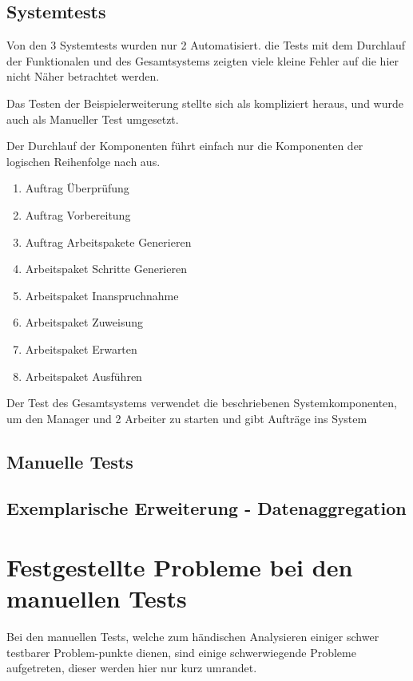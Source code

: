 \subsection{Systemtests}

Von den 3 Systemtests wurden nur 2 Automatisiert.
die Tests mit dem Durchlauf der Funktionalen  und des Gesamtsystems
zeigten viele kleine Fehler auf die hier nicht Näher betrachtet werden.

Das Testen der Beispielerweiterung stellte sich als kompliziert heraus, und wurde auch als Manueller Test umgesetzt.

Der Durchlauf der Komponenten führt einfach nur die Komponenten der logischen Reihenfolge nach aus.
\begin{enumerate}
    \item Auftrag Überprüfung
    \item Auftrag Vorbereitung
    \item Auftrag Arbeitspakete Generieren
    \item Arbeitspaket Schritte Generieren
    \item Arbeitspaket Inanspruchnahme
    \item Arbeitspaket Zuweisung
    \item Arbeitspaket Erwarten
    \item Arbeitspaket Ausführen
\end{enumerate}

Der Test des Gesamtsystems verwendet die beschriebenen Systemkomponenten, um den Manager und 2 Arbeiter zu starten und gibt Aufträge ins System

\subsection{Manuelle Tests}

\subsection{Exemplarische Erweiterung - Datenaggregation}



\section{Festgestellte Probleme bei den manuellen Tests}

Bei den manuellen Tests, welche zum händischen Analysieren
einiger schwer testbarer Problem-punkte dienen,
sind einige schwerwiegende Probleme aufgetreten,
dieser werden hier nur kurz umrandet.

